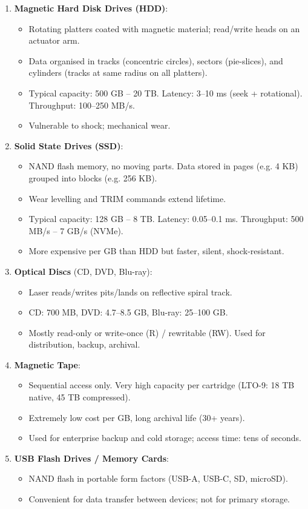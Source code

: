 \documentclass[11pt]{article}
\newcommand{\cle}[1]{{\popxbold\color{popdark}#1}}
\begin{document}
\begin{enumerate}
\item \textbf{Magnetic Hard Disk Drives (HDD)}:
\begin{itemize}
\item Rotating platters coated with magnetic material; read/write heads on an actuator arm.
\item Data organised in \cle{tracks} (concentric circles), \cle{sectors} (pie-slices), and \cle{cylinders} (tracks at same radius on all platters).
\item Typical capacity: 500 GB – 20 TB. Latency: 3–10 ms (seek + rotational). Throughput: 100–250 MB/s.
\item Vulnerable to shock; mechanical wear.
\end{itemize}

\item \textbf{Solid State Drives (SSD)}:
\begin{itemize}
\item NAND flash memory, no moving parts. Data stored in \cle{pages} (e.g. 4 KB) grouped into \cle{blocks} (e.g. 256 KB).
\item \cle{Wear levelling} and \cle{TRIM} commands extend lifetime.
\item Typical capacity: 128 GB – 8 TB. Latency: 0.05–0.1 ms. Throughput: 500 MB/s – 7 GB/s (NVMe).
\item More expensive per GB than HDD but faster, silent, shock-resistant.
\end{itemize}

\item \textbf{Optical Discs} (CD, DVD, Blu-ray):
\begin{itemize}
\item Laser reads/writes pits/lands on reflective spiral track.
\item CD: 700 MB, DVD: 4.7–8.5 GB, Blu-ray: 25–100 GB.
\item Mostly read-only or write-once (R) / rewritable (RW). Used for distribution, backup, archival.
\end{itemize}

\item \textbf{Magnetic Tape}:
\begin{itemize}
\item Sequential access only. Very high capacity per cartridge (LTO-9: 18 TB native, 45 TB compressed).
\item Extremely low cost per GB, long archival life (30+ years).
\item Used for enterprise backup and cold storage; access time: tens of seconds.
\end{itemize}

\item \textbf{USB Flash Drives / Memory Cards}:
\begin{itemize}
\item NAND flash in portable form factors (USB-A, USB-C, SD, microSD).
\item Convenient for data transfer between devices; not for primary storage.
\end{itemize}
\end{enumerate}
\end{document}
